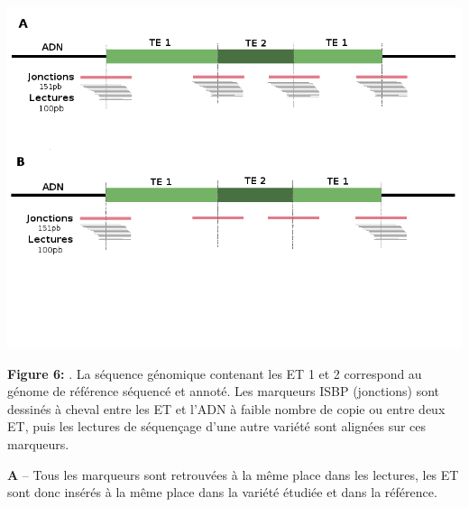 \documentclass[a4paper, 12pt]{article}
\begin{document}
\begin{onehalfspace}
\newpage
\thispagestyle{empty}
\begin{multicols}{2}
\begin{center}
\includegraphics[scale=0.3]{pic_Data/fig4.png}
\vspace{-1.5cm}
\end{center}
\textbf{Figure 6:} . La séquence génomique contenant les ET 1 et 2 correspond au génome de référence séquencé et annoté. Les marqueurs ISBP (jonctions) sont dessinés à cheval entre les ET et l'ADN à faible nombre de copie ou entre deux ET, puis les lectures de séquençage d'une autre variété sont alignées sur ces marqueurs.

\textbf{A} – Tous les marqueurs sont retrouvées à la même place dans les lectures, les ET sont donc insérés à la même place dans la variété étudiée et dans la référence.


\end{multicols}
\end{onehalfspace}
\end{document}
